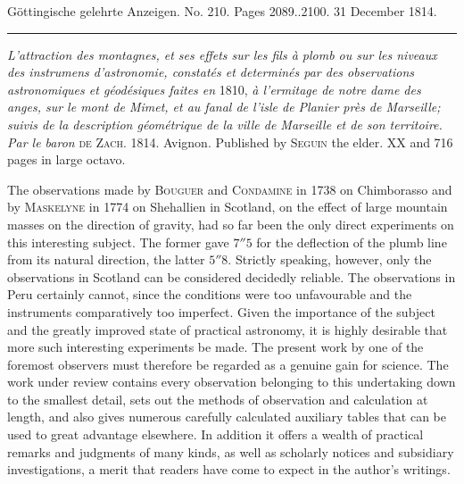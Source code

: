 \clearpage
{}
\hypertarget{native-574-lower}{}
\begin{center}\small Göttingische gelehrte Anzeigen. No. 210. Pages 2089..2100. 31 December 1814.\\[3pt]\rule{.72\linewidth}{.3pt}\end{center}

\emph{L'attraction des montagnes, et ses effets sur les fils à plomb ou sur les niveaux des
instrumens d'astronomie, constatés et determinés par des observations astronomiques et
géodésiques faites en} 1810, \emph{à l'ermitage de notre dame des anges, sur le mont de Mimet, et
au fanal de l'isle de Planier près de Marseille; suivis de la description géométrique de la
ville de Marseille et de son territoire. Par le baron} \textsc{de Zach}. 1814.
Avignon. Published by \textsc{Seguin} the elder. XX and 716 pages in large octavo.

The observations made by \textsc{Bouguer} and \textsc{Condamine} in 1738 on Chimborasso and by \textsc{Maskelyne} in 1774 on Shehallien in Scotland, on the effect of large mountain masses on the direction of gravity, had so far been the only direct experiments on this interesting subject. The former gave $7''5$ for the deflection of the plumb line from its natural direction, the latter $5''8$. Strictly speaking, however, only the observations in Scotland can be considered decidedly reliable. The observations in Peru certainly cannot, since the conditions were too unfavourable and the instruments comparatively too imperfect. Given the importance of the subject and the greatly improved state of practical astronomy, it is highly desirable that more such interesting experiments be made. The present work by one of the foremost observers must therefore be regarded as a genuine gain for science. The work under review contains every observation belonging to this undertaking down to the smallest detail, sets out the methods of observation and calculation at length, and also gives numerous carefully calculated auxiliary tables that can be used to great advantage elsewhere. In addition it offers a wealth of practical remarks and judgments of many kinds, as well as scholarly notices and subsidiary investigations, a merit that readers have come to expect in the author’s writings.

